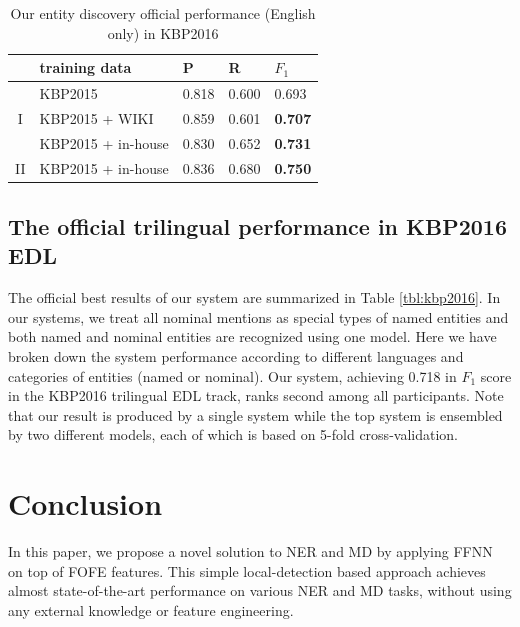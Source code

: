 \documentclass[11pt,a4paper]{article}
\begin{document}
\begin{table}[h]
	\centering
	\begin{tabular}{|c|l|ll|l|}
		\hline
		 & training data  &  P   &  R  &  $F_1$ \\ \hline \hline
		 & KBP2015 &  0.818 & 0.600 & 0.693 \\
		I  & KBP2015 + WIKI  &   0.859 & 0.601 & \bf 0.707 \\
		  & KBP2015 + in-house & 0.830 & 0.652 & \bf 0.731 \\ \hline
		II & KBP2015 + in-house & 0.836 & 0.680 & \bf 0.750 \\ 
		\hline
	\end{tabular}
	\caption{Our entity discovery official performance (English only) in KBP2016 
	}
	\label{tbl:kbp2016-EDL1}	
\end{table}


\subsection{The official trilingual performance in KBP2016 EDL}


The official best results of our system are summarized in Table \ref{tbl:kbp2016}.
In our systems, we treat all nominal mentions as special types of named entities and both named and nominal entities are recognized using one model. Here we have broken down the system performance according to different languages and categories of entities (named or nominal). Our system, achieving 0.718 in $F_1$ score in the KBP2016 trilingual EDL track, ranks second among all participants. Note that our result is produced by a single system while the top system is ensembled by two different models, each of which is based on 5-fold cross-validation.


\section{Conclusion}

In this paper, we propose a novel solution to NER and MD by applying FFNN on top of FOFE features.
This simple local-detection based approach achieves almost state-of-the-art performance on various NER and MD tasks, without using any external knowledge or feature engineering.
\end{document}

